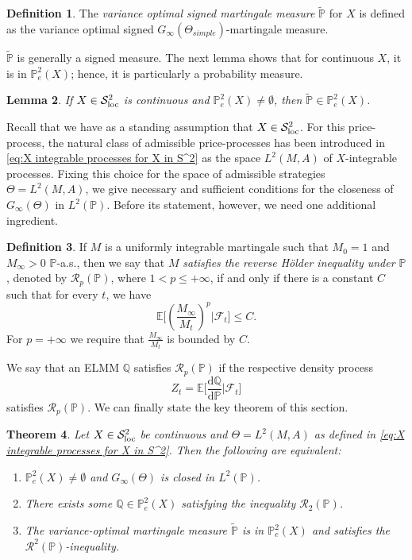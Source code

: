 \documentclass[11pt,a4paper,twoside,openany]{report}
\numberwithin{equation}{section}
\newcommand{\diff}{\mathrm{d}}
\theoremstyle{plain} %
\newtheorem{theorem}{Theorem}[section]
\newtheorem{lemma}[theorem]{Lemma}
\theoremstyle{definition} %
\newtheorem{definition}[theorem]{Definition}
\theoremstyle{remark} %
\begin{document}
    \begin{definition}
        The \textit{variance optimal signed martingale measure} \(\widetilde{\mathbb{P}}\) for \(X\) is defined as the variance optimal signed \(G_{\infty}(\Theta_{simple})\)-martingale measure.
    \end{definition}
    \(\widetilde{\mathbb{P}}\) is generally a signed measure. The next lemma shows that for continuous \(X\), it is in \(\mathbb{P}^2_e(X)\); hence, it is particularly a probability measure. \begin{lemma}\label{lemma:variance optimal signed measure in P_e^2(X)}
        If \(X\in\mathcal{S}^2_{\rm{loc}}\) is continuous and \(\mathbb{P}^2_e(X)\neq \emptyset\), then \(\widetilde{\mathbb{P}}\in\mathbb{P}_e^2(X)\).
    \end{lemma}
    Recall that we have as a standing assumption that \(X\in\mathcal{S}^2_{\rm{loc}}\). For this price-process, the natural class of admissible price-processes has been introduced in 
    \eqref{eq:X integrable processes for X in S^2} as the space \(L^2(M,A)\) of \(X\)-integrable processes. Fixing this choice for the space of admissible strategies \(\Theta=L^2(M,A)\), we give necessary and sufficient conditions for the closeness of \(G_{\infty}(\Theta)\) in \(L^2(\mathbb{P})\). 
Before its statement, however, we need one additional ingredient.
\begin{definition}\label{def:reverse Hölder}
If $M$ is a uniformly integrable martingale such that $M_0=1$ and $M_{\infty}>0$ $\mathbb{P}$-a.s., then we say that
$M$ \emph{satisfies the reverse Hölder inequality under $\mathbb{P}$}, denoted by $\mathcal{R}_p(\mathbb{P})$, where
$1<p\le +\infty$, if and only if there is a constant $C$ such that for every $t$, we have
\[
\mathbb{E}\bigg[(\frac{M_{\infty}}{M_t})^p \bigg| \mathcal{F}_t\bigg]\le C.
\]
For \(p=+\infty\) we require that \(\frac{M_{\infty}}{M_t}\) is bounded by \(C\). 
\end{definition}
We say that an ELMM \(\mathbb{Q}\) satisfies \(\mathcal{R}_p(\mathbb{P})\) if the respective density process 
\begin{equation*}
    Z_t=\mathbb{E}\bigg[\frac{\diff \mathbb{Q}}{\diff \mathbb{P}}\bigg|\mathcal{F}_t\bigg]
\end{equation*}
satisfies \(\mathcal{R}_p(\mathbb{P})\).
We can finally state the key theorem of this section.
\begin{theorem}\label{thm:closedness of G_T(Theta)}
Let \(X\in\mathcal{S}^2_{\rm{loc}}\) be continuous and \(\Theta=L^2(M,A)\) as defined in \eqref{eq:X integrable processes for X in S^2}. Then the following are equivalent:
\begin{enumerate}
\item \(\mathbb{P}_e^2(X)\neq\emptyset\) and
 $G_{\infty}(\Theta)$ is closed in $L^2(\mathbb{P})$.
\item There exists some \(\mathbb{Q}\in\mathbb{P}_e^2(X)\) satisfying the inequality
      $\mathcal{R}_2(\mathbb{P})$.
\item The variance-optimal martingale measure \(\widetilde{\mathbb{P}}\) is in \(\mathbb{P}_e^2(X)\) and satisfies the \(\mathcal{R}^2(\mathbb{P})\)-inequality.
\end{enumerate}
\end{theorem}
\end{document}
